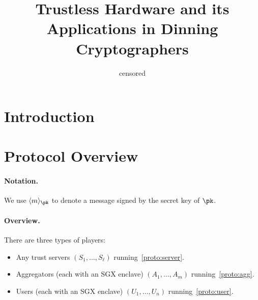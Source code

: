 \documentclass[dvipsnames]{article}
\title{Trustless Hardware and its Applications in Dinning Cryptographers}
\author{censored}
\begin{document}
\maketitle

\section{Introduction}

\section{Protocol Overview}

\paragraph{Notation.} We use $\signed{m}{\pk}$ to denote a message signed by the secret key of $\pk$.

\paragraph{Overview.}

There are three types of players:

\begin{itemize}
    \item Any trust servers $(S_1, \dots, S_\ell)$ running~\cref{proto:server}.
    \item Aggregators (each with an SGX enclave) $(A_1, \dots, A_m)$ running~\cref{proto:agg}.
    \item Users (each with an SGX enclave) $(U_1, \dots, U_n)$ running~\cref{proto:user}.
\end{itemize}
\end{document}
